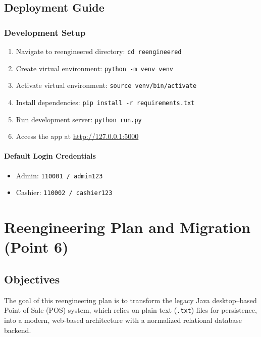 \section{Deployment Guide}

\subsection{Development Setup}

\begin{enumerate}[leftmargin=1.2cm]
  \item Navigate to reengineered directory: \texttt{cd reengineered}
  \item Create virtual environment: \texttt{python -m venv venv}
  \item Activate virtual environment: \texttt{source venv/bin/activate}
  \item Install dependencies: \texttt{pip install -r requirements.txt}
  \item Run development server: \texttt{python run.py}
  \item Access the app at \url{http://127.0.0.1:5000}
\end{enumerate}

\subsubsection*{Default Login Credentials}

\begin{itemize}[leftmargin=1.2cm]
  \item Admin: \texttt{110001 / admin123}
  \item Cashier: \texttt{110002 / cashier123}
\end{itemize}

\chapter{Reengineering Plan and Migration (Point 6)}

\section{Objectives}

The goal of this reengineering plan is to transform the legacy Java desktop--based
Point-of-Sale (POS) system, which relies on plain text (\texttt{.txt}) files for
persistence, into a modern, web-based architecture with a normalized relational
database backend.

